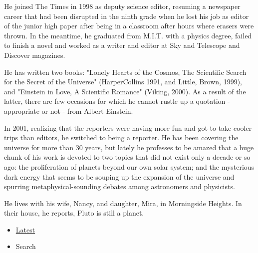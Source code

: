 He joined The Times in 1998 as deputy science editor, resuming a
newspaper career that had been disrupted in the ninth grade when he lost
his job as editor of the junior high paper after being in a classroom
after hours where erasers were thrown. In the meantime, he graduated
from M.I.T. with a physics degree, failed to finish a novel and worked
as a writer and editor at Sky and Telescope and Discover magazines.

He has written two books: "Lonely Hearts of the Cosmos, The Scientific
Search for the Secret of the Universe" (HarperCollins 1991, and Little,
Brown, 1999), and "Einstein in Love, A Scientific Romance" (Viking,
2000). As a result of the latter, there are few occasions for which he
cannot rustle up a quotation - appropriate or not - from Albert
Einstein.

In 2001, realizing that the reporters were having more fun and got to
take cooler trips than editors, he switched to being a reporter. He has
been covering the universe for more than 30 years, but lately he
professes to be amazed that a huge chunk of his work is devoted to two
topics that did not exist only a decade or so ago: the proliferation of
planets beyond our own solar system; and the mysterious dark energy that
seems to be souping up the expansion of the universe and spurring
metaphysical-sounding debates among astronomers and physicists.

He lives with his wife, Nancy, and daughter, Mira, in Morningside
Heights. In their house, he reports, Pluto is still a planet.

\begin{itemize}
\tightlist
\item
  \protect\hyperlink{stream-panel}{Latest}
\item
  Search
\end{itemize}

